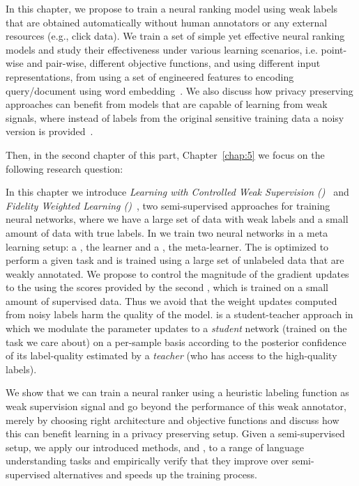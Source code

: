 In this chapter, we propose to train a neural ranking model using weak labels that are obtained automatically without human annotators or any external resources (e.g., click data). We train a set of simple yet effective neural ranking models and study their effectiveness under various learning scenarios, i.e. point-wise and pair-wise, different objective functions, and using different input representations, from using a set of engineered features to encoding query/document using word embedding~\citep{Dehghani:2017:SIGIR}. We also discuss how privacy preserving approaches can benefit from models that are capable of learning from weak signals, where instead of labels from the original sensitive training data a noisy version is provided~\citep{dehghani:2017:neuir}.

Then, in the second chapter of this part, Chapter~\ref{chap:5} we focus on the following research question:

In this chapter we introduce \emph{Learning with Controlled Weak Supervision (\cws)}~\cite{Dehghani:2017:nips_metalearn, Dehghani:2017avoiding} and \emph{Fidelity Weighted Learning (\fwl)}~\citep{dehghani:2018:ICLR}, two semi-supervised approaches for training neural networks, where we have a large set of data with weak labels and a small amount of data with true labels. 
%
In \cws we train two neural networks in a meta learning setup: a \tnet, the learner and a \cnet, the meta-learner.  The \tnet is optimized to perform a given task and is trained using a large set of unlabeled data that are weakly annotated. We propose to control the magnitude of the gradient updates to the \tnet using the scores provided by the second \cnet, which is trained on a small amount of supervised data. Thus we avoid that the weight updates computed from noisy labels harm the quality of the \tnet model.
%
\fwl is a student-teacher approach in which we modulate the parameter updates to a \emph{student} network (trained on the task we care about) on a per-sample basis according to the posterior confidence of its label-quality estimated by a \emph{teacher} (who has access to the high-quality labels).  


We show that we can train a neural ranker using a heuristic labeling function as weak supervision signal and go beyond the performance of this weak annotator, merely by choosing right architecture and objective functions and discuss how this can benefit learning in a privacy preserving setup.
Given a semi-supervised setup, we apply our introduced methods, \cws and \fwl, to a range of language understanding tasks and empirically verify that they improve over semi-supervised alternatives and speeds up the training process. 

\medskip



